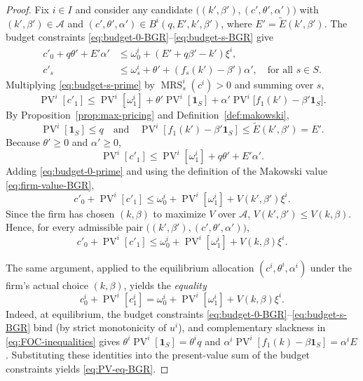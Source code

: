 \documentclass[11pt,a4paper,oneside]{book}
\def\1{\mathbf{1}}
\def\leq{\leqslant}
\def\geq{\geqslant}
\def\et{\quad \text{and} \quad}
\DeclareMathOperator{\MRS}{MRS}
\DeclareMathOperator{\PV}{PV}
\theoremstyle{plain}
\theoremstyle{definition}
\theoremstyle{remark}
\numberwithin{equation}{chapter}
\begin{document}
\begin{proof}
Fix $i \in I$ and consider any candidate $\bigl( (k', \beta'), (c', \theta', \alpha') \bigr)$ with $(k', \beta') \in \mathcal{A}$ and $(c', \theta', \alpha') \in B^i(q, E', k', \beta')$, where $E' = \widetilde{E}(k', \beta')$.
The budget constraints \eqref{eq:budget-0-BGR}--\eqref{eq:budget-s-BGR} give
\begin{align}
  c'_0 + q \theta' + E' \alpha'
  &\leq
  \omega^i_0 + (E' + q \beta' - k') \xi^i,
  \label{eq:budget-0-prime}\\
  c'_s
  &\leq
  \omega^i_s + \theta' + (f_s(k') - \beta') \alpha',
  \quad \text{for all $s\in S$}.
  \label{eq:budget-s-prime}
\end{align}
Multiplying \eqref{eq:budget-s-prime} by $\MRS^i_s(c^i) > 0$ and summing over $s$,
\begin{equation*}
  \PV^i[c'_1]
  \leq
  \PV^i[\omega^i_1] + \theta' \PV^i[\1_S] + \alpha' \PV^i\bigl[ f_1(k') - \beta' \1_S \bigr].
\end{equation*}
By Proposition~\ref{prop:max-pricing} and Definition~\ref{def:makowski},
\begin{equation*}
  \PV^i[\1_S] \leq q
  \et
  \PV^i[f_1(k') - \beta' \1_S] \leq \widetilde{E}(k', \beta') = E'.
\end{equation*}
Because $\theta' \geq 0$ and $\alpha' \geq 0$,
\begin{equation*}
  \PV^i[c'_1]
  \leq
  \PV^i[\omega^i_1] + q \theta' + E' \alpha'.
\end{equation*}
Adding \eqref{eq:budget-0-prime} and using the definition of the Makowski value \eqref{eq:firm-value-BGR},
\begin{equation}\label{eq:PV-bound-prime}
  c'_0 + \PV^i[c'_1]
  \leq
  \omega^i_0 + \PV^i[\omega^i_1] + V(k', \beta') \xi^i.
\end{equation}
Since the firm has chosen $(k, \beta)$ to maximize $V$ over $\mathcal{A}$, $V(k', \beta') \leq V(k, \beta)$.
Hence, for every admissible pair $\bigl( (k', \beta'), (c', \theta', \alpha') \bigr)$,
\begin{equation}\label{eq:PV-bound}
  c'_0 + \PV^i[c'_1]
  \leq
  \omega^i_0 + \PV^i[\omega^i_1] + V(k, \beta) \xi^i.
\end{equation}

The same argument, applied to the equilibrium allocation $(c^i, \theta^i, \alpha^i)$ under the firm's actual choice $(k, \beta)$, yields the \emph{equality}
\begin{equation}\label{eq:PV-eq-BGR}
  c^i_0 + \PV^i[c^i_1]
  =
  \omega^i_0 + \PV^i[\omega^i_1] + V(k, \beta) \xi^i.
\end{equation}
Indeed, at equilibrium, the budget constraints \eqref{eq:budget-0-BGR}--\eqref{eq:budget-s-BGR} bind (by strict monotonicity of $u^i$), and complementary slackness in \eqref{eq:FOC-inequalities} gives $\theta^i \PV^i[\1_S] = \theta^i q$ and $\alpha^i \PV^i[f_1(k) - \beta \1_S] = \alpha^i E$.
Substituting these identities into the present-value sum of the budget constraints yields \eqref{eq:PV-eq-BGR}.


\end{proof}
\end{document}
